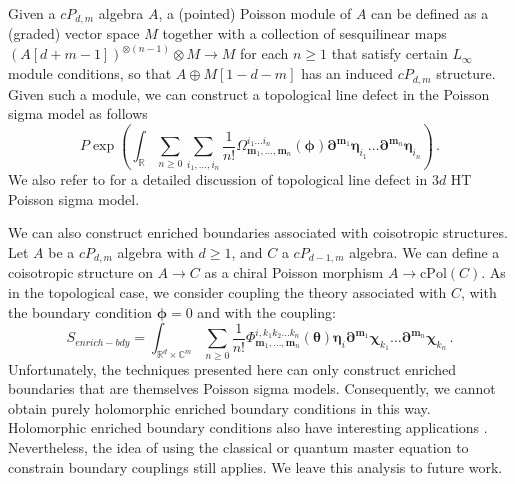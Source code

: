 \documentclass[11pt]{article}
\newcommand{\C}{\mathbb{C}}
\newcommand{\R}{\mathbb{R}}
\numberwithin{equation}{section}
\begin{document}
Given a $cP_{d,m}$ algebra $A$, a (pointed) Poisson module of $A$ can be defined as a (graded) vector space $M$ together with a collection of sesquilinear maps $(A[d+m-1])^{\otimes (n-1)}\otimes M\to M$ for each $n \geq 1$ that satisfy certain $L_\infty$ module conditions, so that $A\oplus M[1-d-m]$ has an induced $cP_{d,m}$ structure. Given such a module, we can construct a topological line defect in the Poisson sigma model as follows
\begin{equation}
	P\exp\left(\int_{\R}\sum_{n\geq 0}\sum_{i_1,\dots,i_{n}}\frac{1}{n!}\Omega^{i_1\dots i_{n}}_{\boldsymbol{m}_1,\dots,\boldsymbol{m}_n}(\boldsymbol{\phi}) \boldsymbol{\partial}^{\boldsymbol{m}_1}\boldsymbol{\eta}_{i_1} \dots \boldsymbol{\partial}^{\boldsymbol{m}_n}\boldsymbol{\eta}_{i_n}\right) \,.
\end{equation}
We also refer to \cite{khan2025poisson} for a detailed discussion of topological line defect in $3d$ HT Poisson sigma model.

We can also construct enriched boundaries associated with coisotropic structures. Let $A$ be a $cP_{d,m}$ algebra with $d\geq  1$, and $C$ a $cP_{d-1,m}$ algebra. We can define a coisotropic structure on $A \to C$ as a chiral Poisson morphism $A \to \mathrm{cPol}(C)$. As in the topological case, we consider coupling the theory associated with $C$, with the boundary condition $\boldsymbol{\phi} = 0$ and with the coupling:
\begin{equation}
S_{enrich-bdy} = \int_{\R^d\times \C^m} \sum_{n\geq 0}\frac{1}{n!}\Phi^{i,k_1k_2\dots k_{n}}_{\boldsymbol{m}_1,\dots,\boldsymbol{m}_n}(\boldsymbol{\theta})\boldsymbol{\eta}_i \boldsymbol{\partial}^{\boldsymbol{m}_1}\boldsymbol{\chi}_{k_1}\dots \boldsymbol{\partial}^{\boldsymbol{m}_n}\boldsymbol{\chi}_{k_n}\,.
\end{equation}
Unfortunately, the techniques presented here can only construct enriched boundaries that are themselves Poisson sigma models. Consequently, we cannot obtain purely holomorphic enriched boundary conditions in this way. Holomorphic enriched boundary conditions also have interesting applications \cite{Gaiotto:2026qai}. Nevertheless, the idea of using the classical or quantum master equation to constrain boundary couplings still applies. We leave this analysis to future work.
\end{document}
